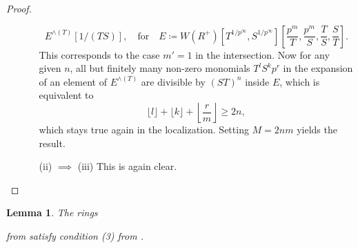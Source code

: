 \documentclass[10pt,twoside]{article}
\numberwithin{equation}{section}
\theoremstyle{plain}
\newtheorem{mylemma}[mythm]{Lemma}
\theoremstyle{definition}
\DeclareMathOperator{\id}{id}
\newcommand{\pRoots}{{1/p^\infty}}
\begin{document}
\begin{proof}
\begin{enumerate}
\begin{enumerate}[align=left]
                \[E^{\wedge(T)}[1/(TS)], \quad \text{for} \quad E\coloneqq W(R^+)[T^{\pRoots}, S^{\pRoots}][\frac{p^m}{T},\frac{p^m}{S},\frac{T}{S},\frac{S}{T}].\]
                This corresponds to the case \(m'=1\) in the intersection. Now for any given \(n\), all but finitely many non-zero monomials \(T^lS^kp^r\) in the expansion of an element of \(E^{\wedge(T)}\) are divisible by \((ST)^n\) inside \(E\), which is equivalent to
                \[\lfloor l\rfloor+\lfloor k\rfloor+\left\lfloor\frac{r}{m}\right\rfloor\geq 2n,\]
                which stays true again in the localization. Setting \(M=2nm\) yields the result.
         \item[(ii) \(\implies\) (iii)] This is again clear.
            \end{enumerate}
        \end{enumerate}
        \end{proof}
\begin{mylemma}\label{caseILemmaAssumption3}
   The rings
    \begin{center}
    \end{center}
    from  satisfy condition (3) from .
\end{mylemma}
\end{document}
